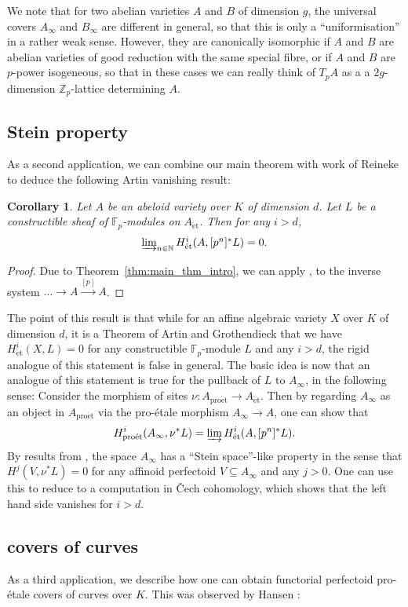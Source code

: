 \documentclass[10pt,oneside]{amsart}
\newtheorem{corollary}[theorem]{Corollary}
\theoremstyle{definition}
\newcommand{\et}{\operatorname{\acute{e}t}}
\newcommand{\proet}{\operatorname{pro\acute{e}t}}
\begin{document}
	We note that for two abelian varieties $A$ and $B$ of dimension $g$, the universal covers $A_\infty$ and $B_\infty$ are different in general, so that this is only a ``uniformisation'' in a rather weak sense. However, they are canonically isomorphic if $A$ and $B$ are abelian varieties of good reduction with the same special fibre, or if $A$ and $B$ are $p$-power isogeneous, so that in these cases we can really think of $T_pA$ as a a $2g$-dimension $\mathbb Z_p$-lattice determining $A$.
	\subsection{Stein property}
	As a second application, we can combine our main theorem with work of Reineke to deduce the following Artin vanishing result:
	\begin{corollary}
		Let $A$ be an abeloid variety over $K$ of dimension $d$. Let $L$ be a constructible sheaf of $\mathbb F_p$-modules on $A_{\et}$. Then for any $i>d$,
		\[\textstyle\varinjlim_{n\in \mathbb N}H_{\et}^i(A,[p^n]^{\ast}L)=0.\]
	\end{corollary}
	\begin{proof}
	Due to Theorem~\ref{thm:main_thm_intro}, we can apply \cite[Theorem 3.3]{Reineke}, to the inverse system $\dots \rightarrow A\xrightarrow{[p]}A$.
	\end{proof}
	The point of this result is that while for an affine algebraic variety $X$ over $K$ of dimension $d$, it is a Theorem of Artin and Grothendieck that we have $H_{\et}^i(X,L)=0$ for any constructible $\mathbb F_p$-module $L$ and any $i>d$, the rigid analogue of this statement is false in general. The basic idea is now that an analogue of this statement is true for the pullback of $L$ to $A_\infty$, in the following sense: Consider the morphism of sites $\nu:A_{\proet}\to A_{\et}$. Then by regarding $A_\infty$ as an object in $A_{\proet}$ via the pro-\'etale morphism $A_\infty\to A$, one can show that
	\[H^i_{\proet}(A_\infty,\nu^{\ast}L)=\varinjlim H^i_{\et}(A,[p^n]^{\ast}L). \]
	By results from \cite{p-adic Hodge}, the space $A_\infty$ has a ``Stein space''-like property in the sense that $H^j(V,\nu^{\ast}L)=0$ for any affinoid perfectoid $V\subseteq A_\infty$ and any $j>0$. One can use this to reduce to a computation in \v{C}ech cohomology, which shows that the left hand side vanishes for $i>d$.
	\subsection{covers of curves}
	As a third application, we describe how one can obtain functorial perfectoid pro-\'etale covers of curves over $K$. This was observed by Hansen \cite{Hansen-blog}:
	
\end{document}
